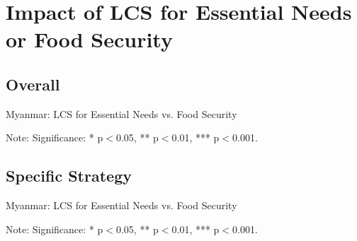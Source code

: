 \documentclass[11pt,harvard]{article}
\begin{document}
\pagebreak

\section{Impact of LCS for Essential Needs or Food Security}

\subsection{Overall}
\begin{table}[htbp]
	\centering
	\begin{adjustbox}{max width=\textwidth}
		\begin{threeparttable}
			\caption{Myanmar: LCS for Essential Needs vs. Food Security}
			\scriptsize
			 
			\label{tab:LCS_F2F_EN_FS_All_Country}
			\begin{tablenotes}
				\item Note: Significance: * p$<$0.05, ** p$<$0.01, *** p$<$0.001. 
			\end{tablenotes}
		\end{threeparttable}
	\end{adjustbox}
\end{table}


\pagebreak


\subsection{Specific Strategy}

\begin{table}[htbp]
	\centering
	\begin{adjustbox}{max width=\textwidth}
		\begin{threeparttable}
			\caption{Myanmar: LCS for Essential Needs vs. Food Security}
			\scriptsize
			 
			\label{tab:LCS_F2F_EN_FS_Myanmar}
			\begin{tablenotes}
				\item Note: Significance: * p$<$0.05, ** p$<$0.01, *** p$<$0.001. 
			\end{tablenotes}
		\end{threeparttable}
	\end{adjustbox}
\end{table}
\end{document}
